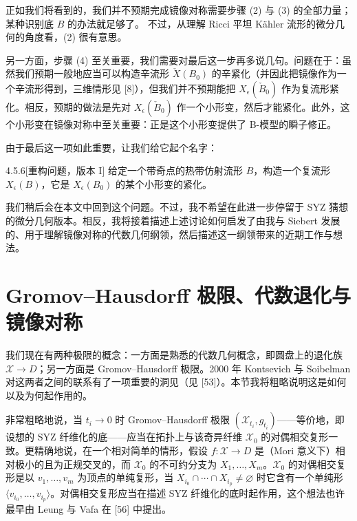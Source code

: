 正如我们将看到的，我们并不预期完成镜像对称需要步骤 (2) 与 (3) 的全部力量；某种识别底 $B$ 的办法就足够了。
不过，从理解 Ricci 平坦 Kähler 流形的微分几何的角度看，(2) 很有意思。

另一方面，步骤 (4) 至关重要，我们需要对最后这一步再多说几句。问题在于：虽然我们预期一般地应当可以构造辛流形 $\check X(B_0)$ 的辛紧化（并因此把镜像作为一个辛流形得到，三维情形见 [8]），但我们并不预期能把 $X_\epsilon(\check B_0)$ 作为复流形紧化。相反，预期的做法是先对 $X_\epsilon(\check B_0)$ 作一个小形变，然后才能紧化。此外，这个小形变在镜像对称中至关重要：正是这个小形变提供了 B-模型的瞬子修正。

由于最后这一项如此重要，让我们给它起个名字：

\begin{question}{4.5.6}[重构问题，版本 I]
给定一个带奇点的热带仿射流形 $B$，构造一个复流形 $X_\epsilon(B)$，它是 $X_\epsilon(B_0)$ 的某个小形变的紧化。
\end{question}

我们稍后会在本文中回到这个问题。不过，我不希望在此进一步停留于 SYZ 猜想的微分几何版本。相反，我将接着描述上述讨论如何启发了由我与 Siebert 发展的、用于理解镜像对称的代数几何纲领，然后描述这一纲领带来的近期工作与想法。

\section{Gromov--Hausdorff 极限、代数退化与镜像对称}
我们现在有两种极限的概念：一方面是熟悉的代数几何概念，即圆盘上的退化族 $\mathcal{X}\to D$；另一方面是 Gromov--Hausdorff 极限。2000 年 Kontsevich 与 Soibelman 对这两者之间的联系有了一项重要的洞见（见 [53]）。本节我将粗略说明这是如何以及为何起作用的。

非常粗略地说，当 $t_i\to0$ 时 Gromov--Hausdorff 极限 $(\mathcal{X}_{t_i},g_{t_i})$------等价地，即设想的 SYZ 纤维化的底------应当在拓扑上与该奇异纤维 $\mathcal{X}_0$ 的对偶相交复形一致。更精确地说，在一个相对简单的情形，假设 $f:\mathcal{X}\to D$ 是（Mori 意义下）相对极小的且为正规交叉的，而 $\mathcal{X}_0$ 的不可约分支为 $X_1,\dots,X_m$。$\mathcal{X}_0$ 的对偶相交复形是以 $v_1,\dots,v_m$ 为顶点的单纯复形，当 $X_{i_0}\cap\cdots\cap X_{i_p}\ne\varnothing$ 时它含有一个单纯形 $\langle v_{i_0},\dots,v_{i_p}\rangle$。对偶相交复形应当在描述 SYZ 纤维化的底时起作用，这个想法也许最早由 Leung 与 Vafa 在 [56] 中提出。


